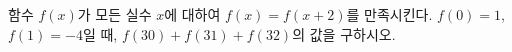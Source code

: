 함수 $f(x)$가 모든 실수 $x$에 대하여 $f(x)=f(x+2)$를 만족시킨다. $f(0)=1$, $f(1)=-4$일 때, $f(30)+f(31)+f(32)$의 값을 구하시오.
